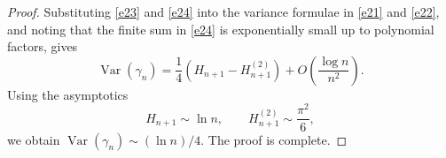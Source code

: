 \documentclass[10pt,a4paper]{amsart}
\newcommand{\Var}{\operatorname{Var}}
\begin{document}
\begin{proof}
Substituting \eqref{e23} and \eqref{e24} into the variance formulae in \eqref{e21} and \eqref{e22}, and noting that the finite sum in \eqref{e24} is exponentially small up to polynomial factors, gives
\[
\Var(\gamma_n)
=
\frac14\left(H_{n+1}-H_{n+1}^{(2)}\right)
+O\!\left(\frac{\log n}{n^2}\right).
\]
Using the asymptotics
\[
H_{n+1}\sim \ln n,\qquad
H_{n+1}^{(2)}\sim \frac{\pi^2}{6},
\]
we obtain $\Var(\gamma_n)\sim (\ln n)/4$. The proof is complete.
\end{proof}
\end{document}
